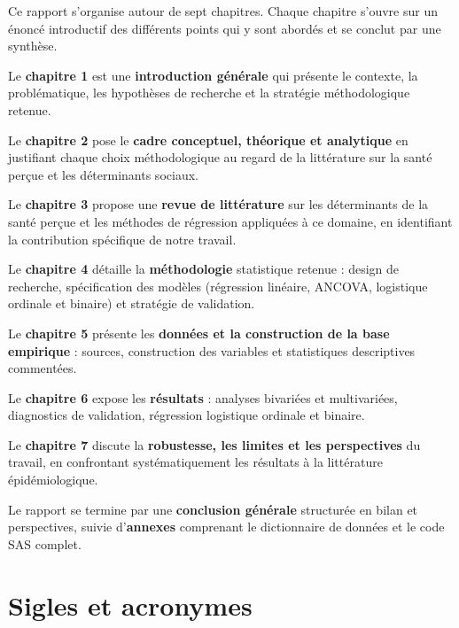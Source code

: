 \documentclass[11pt,a4paper]{memoirerecherche}
\begin{document}
Ce rapport s'organise autour de sept chapitres. Chaque chapitre s'ouvre sur un énoncé introductif des différents points qui y sont abordés et se conclut par une synthèse.

Le \textbf{chapitre 1} est une \textbf{introduction générale} qui présente le contexte, la problématique, les hypothèses de recherche et la stratégie méthodologique retenue.

Le \textbf{chapitre 2} pose le \textbf{cadre conceptuel, théorique et analytique} en justifiant chaque choix méthodologique au regard de la littérature sur la santé perçue et les déterminants sociaux.

Le \textbf{chapitre 3} propose une \textbf{revue de littérature} sur les déterminants de la santé perçue et les méthodes de régression appliquées à ce domaine, en identifiant la contribution spécifique de notre travail.

Le \textbf{chapitre 4} détaille la \textbf{méthodologie} statistique retenue : design de recherche, spécification des modèles (régression linéaire, ANCOVA, logistique ordinale et binaire) et stratégie de validation.

Le \textbf{chapitre 5} présente les \textbf{données et la construction de la base empirique} : sources, construction des variables et statistiques descriptives commentées.

Le \textbf{chapitre 6} expose les \textbf{résultats} : analyses bivariées et multivariées, diagnostics de validation, régression logistique ordinale et binaire.

Le \textbf{chapitre 7} discute la \textbf{robustesse, les limites et les perspectives} du travail, en confrontant systématiquement les résultats à la littérature épidémiologique.

Le rapport se termine par une \textbf{conclusion générale} structurée en bilan et perspectives, suivie d'\textbf{annexes} comprenant le dictionnaire de données et le code SAS complet.

\newpage

\hypertarget{sigles-et-acronymes}{%
\section*{Sigles et acronymes}\label{sigles-et-acronymes}}
\end{document}

